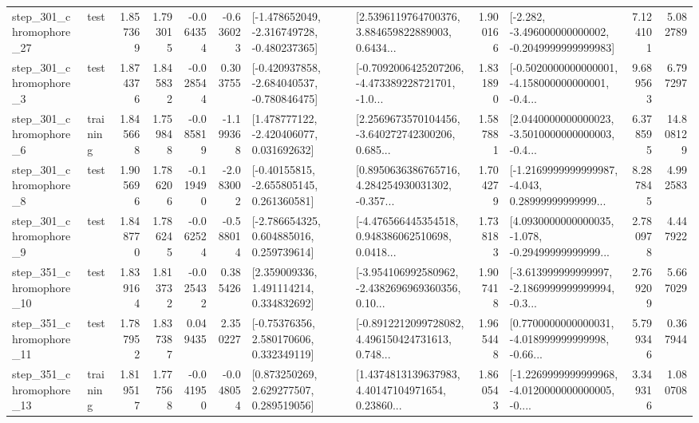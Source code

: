 \begin{tabular}{llrrrrllrlrr}
  step\_301\_chromophore\_27 &      test &      1.857369 &    1.793015 &     -0.064354 & -0.636023 &  [-1.478652049, -2.316749728, -0.480237365] &  [2.5396119764700376, 3.884659822889003, 0.6434... &       1.900166 &  [-2.282, -3.496000000000002, -0.2049999999999983] &            7.124101 &          5.082789 \\
   step\_301\_chromophore\_3 &      test &      1.874376 &    1.845832 &     -0.028544 &  0.303755 &  [-0.420937858, -2.684040537, -0.780846475] &  [-0.7092006425207206, -4.473389228721701, -1.0... &       1.831890 &  [-0.5020000000000001, -4.158000000000001, -0.4... &            9.689563 &          6.797297 \\
   step\_301\_chromophore\_6 &  training &      1.845668 &    1.759848 &     -0.085819 & -1.199368 &    [1.478777122, -2.420406077, 0.031692632] &  [2.2569673570104456, -3.640272742300206, 0.685... &       1.587881 &  [2.0440000000000023, -3.5010000000000003, -0.4... &            6.378595 &         14.808129 \\
   step\_301\_chromophore\_8 &      test &      1.905696 &    1.786206 &     -0.119490 & -2.083002 &    [-0.40155815, -2.655805145, 0.261360581] &  [0.8950636386765716, 4.284254930031302, -0.357... &       1.704279 &  [-1.2169999999999987, -4.043, 0.28999999999999... &            8.287845 &          4.992583 \\
   step\_301\_chromophore\_9 &      test &      1.848770 &    1.786245 &     -0.062524 & -0.588014 &    [-2.786654325, 0.604885016, 0.259739614] &  [-4.476566445354518, 0.948386062510698, 0.0418... &       1.738183 &  [4.0930000000000035, -1.078, -0.29499999999999... &            2.780978 &          4.447922 \\
  step\_351\_chromophore\_10 &      test &      1.839164 &    1.813732 &     -0.025432 &  0.385426 &     [2.359009336, 1.491114214, 0.334832692] &  [-3.954106992580962, -2.4382696969360356, 0.10... &       1.907418 &  [-3.613999999999997, -2.1869999999999994, -0.3... &            2.769209 &          5.667029 \\
  step\_351\_chromophore\_11 &      test &      1.787952 &    1.837387 &      0.049435 &  2.350227 &     [-0.75376356, 2.580170606, 0.332349119] &  [-0.8912212099728082, 4.496150424731613, 0.748... &       1.965448 &  [0.7700000000000031, -4.018999999999998, -0.66... &            5.799346 &          0.367944 \\
  step\_351\_chromophore\_13 &  training &      1.819517 &    1.777568 &     -0.041950 & -0.048054 &     [0.873250269, 2.629277507, 0.289519056] &  [1.4374813139637983, 4.40147104971654, 0.23860... &       1.860543 &  [-1.2269999999999968, -4.0120000000000005, -0.... &            3.349316 &          1.080708 \\

\end{tabular}

